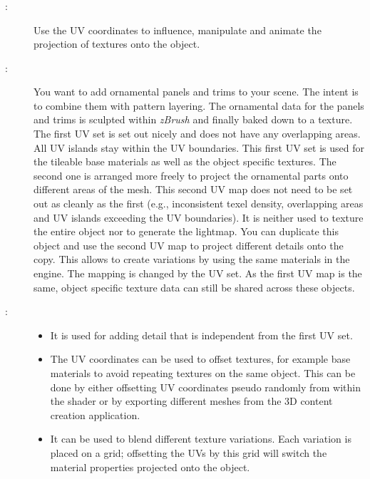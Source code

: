 \subsubsection{\patMeshDataUVs}\label{\patMeshDataUVs}
\begin{description}
	\item[\patIntent:]%
	Use the UV coordinates to influence, manipulate and animate the projection of textures onto the object. 
	\item[\patMotivation:]%
	You want to add ornamental panels and trims to your scene. The intent is to combine them with pattern layering. The ornamental data for the panels and trims is sculpted within \emph{zBrush} and finally baked down to a texture. The first UV set is set out nicely and does not have any overlapping areas. All UV islands stay within the UV boundaries. This first UV set is used for the tileable base materials as well as the object specific textures. The second one is arranged more freely to project the ornamental parts onto different areas of the mesh. This second UV map does not need to be set out as cleanly as the first (e.g., inconsistent texel density, overlapping areas and UV islands exceeding the UV boundaries). It is neither used to texture the entire object nor to generate the lightmap. You can duplicate this object and use the second UV map to project different details onto the copy. This allows to create variations by using the same materials in the engine. The mapping is changed by the UV set. As the first UV map is the same, object specific texture data can still be shared across these objects.
	\item[\patApplicability:]\hfill 
	\begin{itemize}\mynobreakpar
		\item It is used for adding detail that is independent from the first UV set. 
		\item The UV coordinates can be used to offset textures, for example base materials to avoid repeating textures on the same object. This can be done by either offsetting UV coordinates pseudo randomly from within the shader or by exporting different meshes from the 3D content creation application. 
		\item It can be used to blend different texture variations. Each variation is placed on a grid; offsetting the UVs by this grid will switch the material properties projected onto the object. 

\end{itemize}
\end{description}
